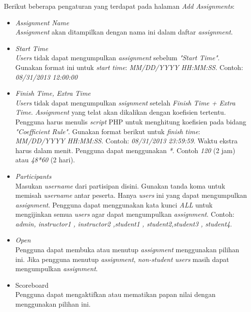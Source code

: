 Berikut beberapa pengaturan yang terdapat pada halaman \textit{Add Assignments}:
\begin{itemize}
	\item \textit{Assignment Name} \\
	\textit{Assignment} akan ditampilkan dengan nama ini dalam daftar \textit{assignment}.
	
	\item \textit{Start Time} \\
	\textit{Users} tidak dapat mengumpulkan \textit{assignment} sebelum \textit{"Start Time"}. Gunakan format ini untuk \textit{start time}: \textit{MM/DD/YYYY HH:MM:SS}. Contoh: \textit{08/31/2013 12:00:00}
	
	\item \textit{Finish Time, Extra Time}\\
	\textit{Users} tidak dapat mengumpulkan \textit{ssignment} setelah \textit{Finish Time + Extra Time}. \textit{Assignment} yang telat akan dikalikan dengan koefisien tertentu. Pengguna harus menulis \textit{script} PHP untuk menghitung koefisien pada bidang \textit{"Coefficient Rule"}. Gunakan format berikut untuk \textit{finish time}: \textit{MM/DD/YYYY HH:MM:SS}. Contoh: \textit{08/31/2013 23:59:59}. Waktu ekstra harus dalam menit. Pengguna dapat menggunakan \textit{*}. Contoh \textit{120} (2 jam) atau \textit{48*60} (2 hari).
	
	\item \textit{Participants} \\
	Masukan \textit{username} dari partisipan disini. Gunakan tanda koma untuk memisah \textit{username} antar peserta. Hanya \textit{users} ini yang dapat mengumpulkan \textit{assignment}. Pengguna dapat menggunakan kata kunci \textit{ALL} untuk mengijinkan semua \textit{users} agar dapat mengumpulkan \textit{assignment}. Contoh: \textit{admin, instructor1 , instructor2 ,student1  ,   student2,student3 , student4}.
	
	\item \textit{Open} \\
	Pengguna dapat membuka atau menutup \textit{assignment} menggunakan pilihan ini. Jika pengguna menutup \textit{assignment}, \textit{non-student users} masih dapat mengumpulkan \textit{assignment}.
	
	\item Scoreboard \\
	Pengguna dapat mengaktifkan atau mematikan papan nilai dengan menggunakan pilihan ini.
	

\end{itemize}
